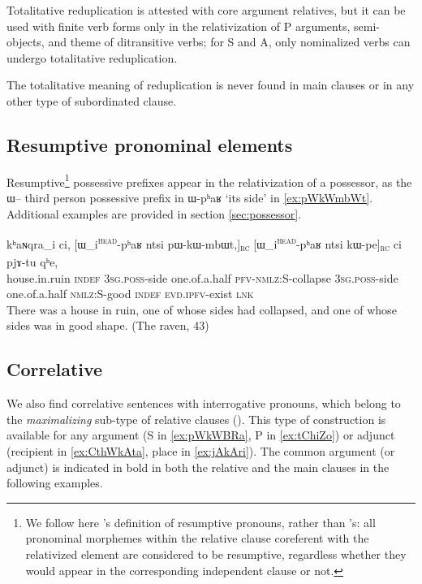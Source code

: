 \documentclass[oldfontcommands,oneside,a4paper,11pt]{article}
\newcommand{\ipa}[1]{{\phon #1}} %
\newcommand{\tete}{\textsuperscript{\textsc{head}}}
\newcommand{\rc}{\textsubscript{\textsc{rc}}}
\begin{document}
Totalitative reduplication is attested with core argument relatives, but it can be used with finite verb forms only in the relativization of P arguments, semi-objects, and theme of ditransitive verbs; for S and A, only nominalized verbs can undergo totalitative reduplication. 

The totalitative meaning of reduplication is never found in main clauses or in any other type of subordinated clause.


\subsection{Resumptive pronominal elements} \label{sec:resumptive}
 

Resumptive\footnote{We follow here \citet[211]{creissels06sgit2}'s definition of resumptive pronouns, rather than \citet{comrie81relative}'s: all pronominal morphemes within the relative clause coreferent with the relativized element are considered to be resumptive, regardless whether they would appear in the corresponding independent clause or not. } possessive prefixes appear in the relativization of a possessor, as the \ipa{ɯ}-- third person possessive prefix in \ipa{ɯ-pʰaʁ} `its side' in  \ref{ex:pWkWmbWt}. Additional examples are provided in section \ref{sec:possessor}.

  \begin{exe}
\ex \label{ex:pWkWmbWt}
\gll
\ipa{kʰaɴqra}_i  	\ipa{ci,}  	[\ipa{ɯ_i\tete{}-pʰaʁ}	\ipa{ntsi}  	\ipa{pɯ-kɯ-mbɯt,}]\rc{}  	[\ipa{ɯ_i\tete{}-pʰaʁ}   	\ipa{ntsi}  	\ipa{kɯ-pe}]\rc{}  	\ipa{ci}  	\ipa{pjɤ-tu}  	\ipa{qʰe,}  \\
house.in.ruin \textsc{indef} \textsc{3sg.poss}-side one.of.a.half \textsc{pfv-nmlz}:S-collapse \textsc{3sg.poss}-side one.of.a.half \textsc{nmlz}:S-good \textsc{indef} \textsc{evd.ipfv}-exist  \textsc{lnk} \\
\glt There was a house in ruin, one of whose sides had collapsed, and one of whose sides was in good shape. (The raven, 43)
\end{exe}


\subsection{Correlative} \label{sec:correlative}
We also find correlative sentences with interrogative pronouns, which belong to the \textit{maximalizing} sub-type of relative clauses (\citealt{grosu98maximalizing}).
 This type of construction is available for any argument (S in \ref{ex:pWkWBRa}, P in \ref{ex:tChiZo}) or adjunct (recipient in \ref{ex:CthWkAta}, place in \ref{ex:jAkAri}). The common argument (or adjunct) is indicated in bold in both the relative and the main clauses in the following examples.
\end{document}
